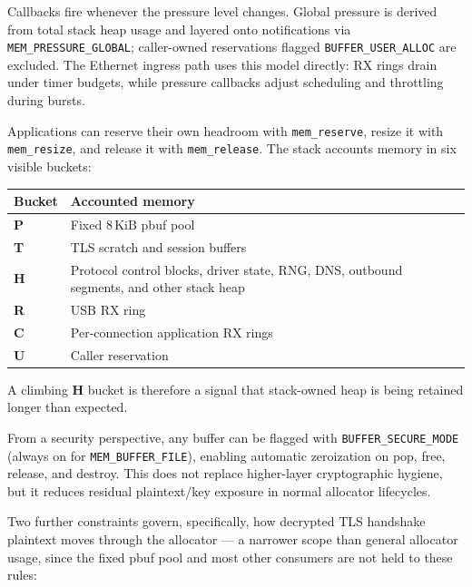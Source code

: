 \documentclass[titlepage]{report}
\begin{document}
		Callbacks fire whenever the pressure level changes. Global pressure is derived from total stack heap usage and layered onto notifications via \texttt{MEM\_PRESSURE\_GLOBAL}; caller-owned reservations flagged \texttt{BUFFER\_USER\_ALLOC} are excluded. The Ethernet ingress path uses this model directly: RX rings drain under timer budgets, while pressure callbacks adjust scheduling and throttling during bursts.

		Applications can reserve their own headroom with \texttt{mem\_reserve}, resize it with \texttt{mem\_resize}, and release it with \texttt{mem\_release}. The stack accounts memory in six visible buckets: 
		
		\begin{center}
			\footnotesize
			\begin{tabularx}{\textwidth}{@{}>{\centering\arraybackslash}p{}X@{}}
				\toprule
				\rowcolor{gray!18}
				\textbf{Bucket} & \textbf{Accounted memory} \\
				\midrule
				\textbf{P} & Fixed $8\,\text{KiB}$ pbuf pool \\
				\textbf{T} & TLS scratch and session buffers \\
				\textbf{H} & Protocol control blocks, driver state, RNG, DNS, outbound segments, and other stack heap \\
				\textbf{R} & USB RX ring \\
				\textbf{C} & Per-connection application RX rings \\
				\textbf{U} & Caller reservation \\
				\bottomrule
			\end{tabularx}
		\end{center}

		A climbing \textbf{H} bucket is therefore a signal that stack-owned heap is being retained longer than expected.\label{ssec:mem_accounting}

		From a security perspective, any buffer can be flagged with \texttt{BUFFER\_SECURE\_MODE} (always on for \texttt{MEM\_BUFFER\_FILE}), enabling automatic zeroization on pop, free, release, and destroy. This does not replace higher-layer cryptographic hygiene, but it reduces residual plaintext/key exposure in normal allocator lifecycles.

		Two further constraints govern, specifically, how decrypted TLS handshake plaintext moves through the allocator --- a narrower scope than general allocator usage, since the fixed pbuf pool and most other consumers are not held to these rules:
\end{document}
